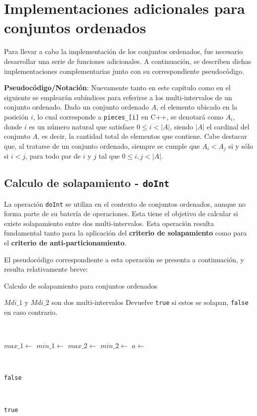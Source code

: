 \chapter{Implementaciones adicionales para conjuntos ordenados}

Para llevar a cabo la implementación de los conjuntos ordenados, fue necesario desarrollar una serie de funciones adicionales. A continuación, se describen dichas implementaciones complementarias junto con su correspondiente pseudocódigo.

\textbf{Pseudocódigo/Notación}: Nuevamente tanto en este capitulo como en el siguiente se emplearán subíndices para referirse a los multi-intervalos de un conjunto ordenado. Dado un conjunto ordenado $A$, el elemento ubicado en la posición $i$, lo cual corresponde a \texttt{pieces\_[i]} en C++, se denotará como \textbf{$A_i$}, donde $i$ es un número natural que satisface $0 \leq i < |A|$, siendo $|A|$ el cardinal del conjunto $A$, es decir, la cantidad total de elementos que contiene. Cabe destacar que, al tratarse de un conjunto ordenado, siempre se cumple que $A_i < A_j$ si y sólo si $i < j$, para todo par de $i$ y $j$ tal que $0  \leq i, j < |A|$.


\section*{Calculo de solapamiento - \texttt{doInt}}

La operación \texttt{doInt} se utiliza en el contexto de conjuntos ordenados, aunque no forma parte de su batería de operaciones. Esta tiene el objetivo de calcular si existe solapamiento entre dos multi-intervalos. Esta operación resulta fundamental tanto para la aplicación del \textbf{criterio de solapamiento} como para el \textbf{criterio de anti-particionamiento}.

El pseudocódigo correspondiente a esta operación se presenta a continuación, y resulta relativamente breve:


\begin{algorithm}
\caption{Calculo de solapamiento para conjuntos ordenados}
\begin{algorithmic}[1]
\Require $Mdi\_1$ y $Mdi\_2$ son dos multi-intervalos
\Ensure Devuelve \texttt{true} si estos se solapan, \texttt{false} en caso contrario.

    \
    
    \State $max\_1 \gets$ 
    \State $min\_1 \gets$ 
    \State $max\_2 \gets$ 
    \State $min\_2 \gets$ 
    \State $a \gets$ 

    \

            \State \Return \texttt{false} 
        \EndIf
    \EndFor

    \
    
    \State \Return \texttt{true} 

\EndFunction
\end{algorithmic}
\end{algorithm}

